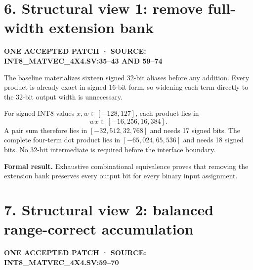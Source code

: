 \documentclass[10pt,a4paper]{article}
\newcommand{\smallcaps}[1]{\textcolor{Mid}{\fontsize{8.5}{10}\selectfont\bfseries\MakeUppercase{#1}}}
\newcommand{\newpageheading}[2]{\clearpage\section{#1}\smallcaps{#2}\vspace{6pt}}
\begin{document}
\newpageheading{6. Structural view 1: remove full-width extension bank}{One accepted patch · source: int8\_matvec\_4x4.sv:35--43 and 59--74}

The baseline materializes sixteen signed 32-bit aliases before any addition. Every product is already exact in signed 16-bit form, so widening each term directly to the 32-bit output width is unnecessary.

\begin{center}
\end{center}

For signed INT8 values $x,w\in[-128,127]$, each product lies in
\[
wx\in[-16{,}256,16{,}384].
\]
A pair sum therefore lies in $[-32{,}512,32{,}768]$ and needs 17 signed bits. The complete four-term dot product lies in $[-65{,}024,65{,}536]$ and needs 18 signed bits. No 32-bit intermediate is required before the interface boundary.

\begin{claimbox}
\textbf{Formal result.} Exhaustive combinational equivalence proves that removing the extension bank preserves every output bit for every binary input assignment.
\end{claimbox}

\newpageheading{7. Structural view 2: balanced range-correct accumulation}{One accepted patch · source: int8\_matvec\_4x4.sv:59--70}
\end{document}
